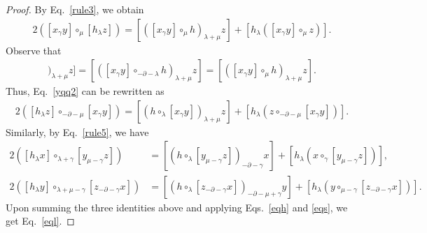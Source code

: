 \documentclass[10pt,a4paper]{amsart}
\begin{document}
\begin{proof}
By Eq.~\eqref{rule3}, we obtain
   \begin{align}\label{yqq2}
      2\left([x_{\gamma}y]\circ_{\mu}[h_{\lambda}z]\right)=[([x_{\gamma}y]\circ_{\mu}h)_{\lambda+\mu}z]+[h_{\lambda}([x_{\gamma}y]\circ_{\mu}z)].
   \end{align}
Observe that
   \begin{align*}
      [(h\circ_{\lambda}[x_{\gamma}y])_{\lambda+\mu}z]=[([x_{\gamma}y]\circ_{-\partial-\lambda}h)_{\lambda+\mu}z]
      =[([x_{\gamma}y]\circ_{\mu}h)_{\lambda+\mu}z].
   \end{align*}
Thus, Eq.~\eqref{yqq2} can be rewritten as
   \begin{align*}
      2\left([h_{\lambda}z]\circ_{-\partial-\mu}[x_{\gamma}y]\right)=[(h\circ_{\lambda}[x_{\gamma}y])_{\lambda+\mu}z]+[h_{\lambda}(z\circ_{-\partial-\mu}[x_{\gamma}y])].
   \end{align*}
Similarly, by Eq.~\eqref{rule5}, we have
   \begin{align*}
      2([h_{\lambda}x]\circ_{\lambda+\gamma}[y_{\mu-\gamma}z])&=[(h\circ_{\lambda}[y_{\mu-\gamma}z])_{-\partial-\gamma}x]+[h_{{\lambda}}(x\circ_{\gamma}[y_{\mu-\gamma}z])],\\
      2([h_{\lambda}y]\circ_{\lambda+\mu-\gamma}[z_{-\partial-\gamma}x])&=[(h\circ_{\lambda}[z_{-\partial-\gamma}x])_{-\partial-\mu+\gamma}y]+[h_{{\lambda}}(y\circ_{\mu-\gamma}[z_{-\partial-\gamma}x])].
   \end{align*}
Upon summing the three identities above and applying Eqs.~\eqref{eqh} and \eqref{eqs}, we get Eq.~\eqref{eql}.


\end{proof}
\end{document}
